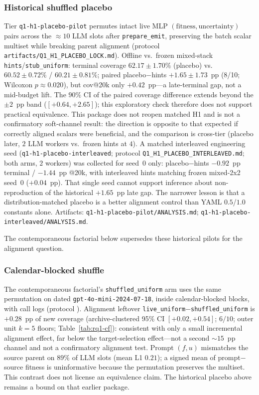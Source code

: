 \subsubsection*{Historical shuffled placebo}
Tier \texttt{q1-h1-placebo-pilot} permutes intact live MLP $(\mathrm{fitness},\mathrm{uncertainty})$ pairs across the ${\approx}10$ LLM slots after \texttt{prepare\_emit}, preserving the batch scalar multiset while breaking parent alignment (protocol \texttt{artifacts/Q1\_H1\_PLACEBO\_LOCK.md}). Offline vs.\ frozen mixed-stack \texttt{hints}/\texttt{stub\_uniform}: terminal coverage $62.17\pm1.70\%$ (placebo) vs.\ $60.52\pm0.72\%$ / $60.21\pm0.81\%$; paired placebo$-$hints $+1.65\pm1.73$~pp (8/10; Wilcoxon $p{\approx}0.020$), but cov@20k only $+0.42$~pp---a late-terminal gap, not a mid-budget lift. The $90\%$ CI of the paired coverage difference extends beyond the $\pm 2$~pp band ($[+0.64,+2.65]$); this exploratory check therefore does not support practical equivalence. This package does not reopen matched H1 and is not a confirmatory soft-channel result: the direction is opposite to that expected if correctly aligned scalars were beneficial, and the comparison is cross-tier (placebo later, $2$ LLM workers vs.\ frozen hints at $4$). A matched interleaved engineering seed (\texttt{q1-h1-placebo-interleaved}; protocol \texttt{Q1\_H1\_PLACEBO\_INTERLEAVED.md}; both arms, $2$ workers) was collected for seed~0 only: placebo$-$hints $-0.92$~pp terminal / $-1.44$~pp @20k, with interleaved hints matching frozen mixed-2x2 seed~0 ($+0.04$~pp). That single seed cannot support inference about non-reproduction of the historical $+1.65$~pp late gap. The narrower lesson is that a distribution-matched placebo is a better alignment control than YAML $0.5$/$1.0$ constants alone. Artifacts: \texttt{q1-h1-placebo-pilot/ANALYSIS.md}; \texttt{q1-h1-placebo-interleaved/ANALYSIS.md}.

The contemporaneous factorial below supersedes these historical pilots for the alignment question.

\subsubsection*{Calendar-blocked shuffle}
The contemporaneous factorial's \texttt{shuffled\_uniform} arm uses the same permutation on dated \texttt{gpt-4o-mini-2024-07-18}, inside calendar-blocked blocks, with call logs (protocol ). Alignment leftover \texttt{live\_uniform}$-$\texttt{shuffled\_uniform} is $+0.28$~pp of new coverage (archive-clustered 95\% CI $[+0.02,+0.54]$; $6/10$; outer unit $k{=}5$ floors; Table~\ref{tab:rq1-cf}): consistent with only a small incremental alignment effect, far below the target-selection effect---not a second ${\sim}15$~pp channel and not a confirmatory alignment test. Prompt $(f,u)$ mismatches the source parent on $89\%$ of LLM slots (mean L1 $0.21$); a signed mean of prompt$-$source fitness is uninformative because the permutation preserves the multiset. This contrast does not license an equivalence claim. The historical placebo above remains a bound on that earlier package.

